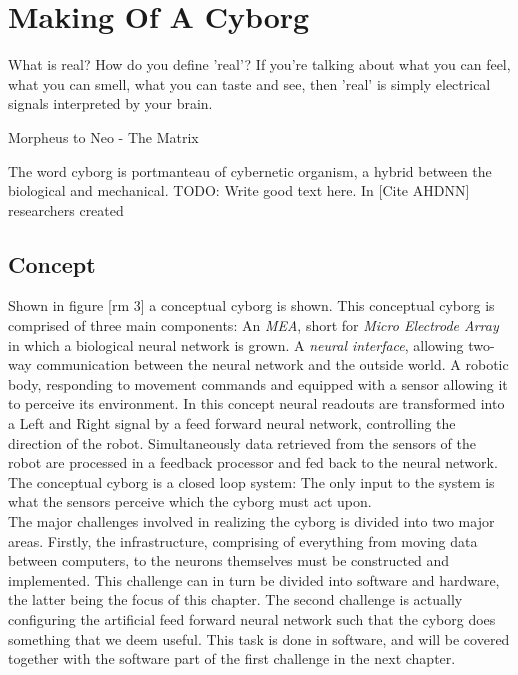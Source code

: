 \chapter{Making Of A Cyborg}
\epigraph{What is real? How do you define 'real'? If you're talking about what
you can feel, what you can smell, what you can taste and see, then 'real' is
simply electrical signals interpreted by your brain.}
{Morpheus to Neo - The Matrix}
The word cyborg is portmanteau of cybernetic organism, a hybrid between the
biological and mechanical.
TODO: Write good text here.
In [Cite AHDNN] researchers created 
\section{Concept}
Shown in figure [rm 3] a conceptual cyborg is shown.
This conceptual cyborg is comprised of three main components: An \emph{MEA}, short
for \emph{Micro Electrode Array} in which a biological neural network is grown.
A \emph{neural interface}, allowing two-way communication between the neural network and
the outside world.
A robotic body, responding to movement commands and equipped with a sensor
allowing it to perceive its environment.
In this concept neural readouts are transformed into a Left and Right signal by
a feed forward neural network, controlling the direction of the robot.
Simultaneously data retrieved from the sensors of the robot are processed in a
feedback processor and fed back to the neural network.
The conceptual cyborg is a closed loop system: The only input to the system is
what the sensors perceive which the cyborg must act upon.\\
The major challenges involved in realizing the cyborg is divided into two major
areas.
Firstly, the infrastructure, comprising of everything from moving data between
computers, to the neurons themselves must be constructed and implemented.
This challenge can in turn be divided into software and hardware, the latter
being the focus of this chapter.
The second challenge is actually configuring the artificial feed forward neural
network such that the cyborg does something that we deem useful.
This task is done in software, and will be covered together with the software
part of the first challenge in the next chapter.
